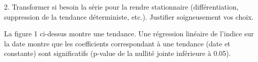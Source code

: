 \documentclass[a4paper, 12pt]{article} %
\begin{document}
\begin{tcolorbox}
{\small
2. Transformer si besoin la série pour la rendre stationnaire (différentiation, suppression de la tendance
déterministe, etc.). Justifier soigneusement vos choix.}
\end{tcolorbox}
{\normalsize
{La figure 1 ci-dessus montre une tendance. Une régression linéaire de l'indice sur la date montre que les coefficients correspondant à une tendance (date et constante) sont significatifs (p-value de la nullité jointe inférieure à 0.05). }}
\begin{table}[h]
    \centering
    \caption{Régression linéaire de l'indice sur la date}
\end{table}
\end{document}
